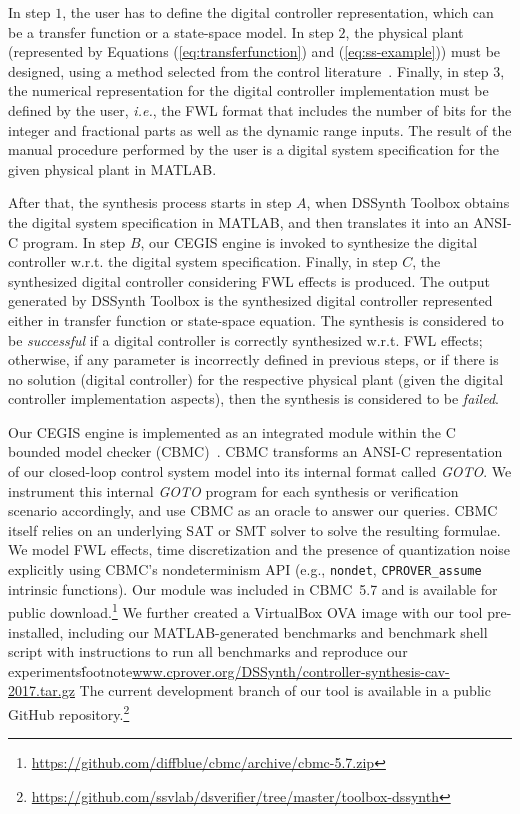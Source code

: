 \documentclass[10pt,conference]{IEEEtran}
\newcommand\tool{{DSSynth Toolbox}\xspace}
\begin{document}
In step $1$, the user has to define the digital controller representation, 
which can be a transfer function or a state-space model. 
In step $2$, the physical plant (represented by Equations (\ref{eq:transferfunction}) 
and (\ref{eq:ss-example})) must be designed, using a method selected 
from the control literature~\cite{astrom1997computer}. Finally, in step $3$, 
the numerical representation for the digital controller implementation must be 
defined by the user, {\it i.e.}, the FWL format that includes the number of bits for the integer 
and fractional parts as well as the dynamic range inputs. The result of the manual 
procedure performed by the user is a digital system specification for the given 
physical plant in MATLAB. 

After that, the synthesis process starts in step $A$, when \tool obtains the digital system 
specification in MATLAB, and then translates it into an ANSI-C program. 
In step $B$, our CEGIS engine is invoked to synthesize the digital controller w.r.t. the digital system
specification. Finally, in step $C$, the synthesized digital controller considering FWL effects is produced. 
The output generated by \tool is the synthesized digital controller represented either in transfer function 
or state-space equation. The synthesis is considered to be \emph{successful} if a digital controller is correctly 
synthesized w.r.t. FWL effects; otherwise, if any parameter is incorrectly defined in previous steps, 
or if there is no solution (digital controller) for the respective physical plant (given the digital controller
 implementation aspects), then the synthesis is considered to be \emph{failed}.

Our CEGIS engine is implemented as an integrated module within the C bounded model checker (CBMC)~\cite{cbmc}.  CBMC
transforms an ANSI-C representation of our closed-loop control system model into its internal format called
\emph{GOTO}.  We instrument this internal \emph{GOTO} program for each synthesis or verification scenario accordingly,
and use CBMC as an oracle to answer our queries.  CBMC itself relies on an underlying SAT or SMT solver to solve the
resulting formulae.  We model FWL effects, time discretization and the presence of quantization noise explicitly using CBMC's  
nondeterminism API (e.g., \texttt{nondet}, \texttt{CPROVER\_assume} intrinsic functions).  Our module was included in CBMC~5.7 and is available for
public download.\footnote{\url{https://github.com/diffblue/cbmc/archive/cbmc-5.7.zip}}  We further created a VirtualBox OVA image
with our tool pre-installed, including our MATLAB-generated benchmarks and benchmark shell script with instructions
to run all benchmarks and reproduce our
experiments\.footnote{\url{www.cprover.org/DSSynth/controller-synthesis-cav-2017.tar.gz}}  The current development branch
of our tool is available in a public GitHub
repository.\footnote{\url{https://github.com/ssvlab/dsverifier/tree/master/toolbox-dssynth}}
\end{document}
